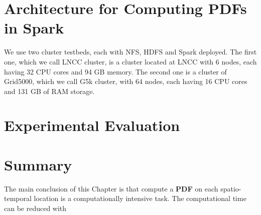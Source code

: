 \section{Architecture for Computing PDFs in Spark}\label{sec:spark_architecture}
We use two cluster testbeds, each with NFS, HDFS and Spark deployed. The first one, which we call LNCC cluster, is a cluster located at LNCC with 6 nodes, each having 32 CPU cores and 94 GB memory. The second one is a cluster of Grid5000, which we call G5k cluster, with 64 nodes, each having 16 CPU cores and 131 GB of RAM storage.

\section{Experimental Evaluation}\label{sec:experiments}

\section{Summary}\label{sec:summary}
The main conclusion of this Chapter is that compute a \textbf{PDF} on each spatio-temporal location is a computationally intensive task. The computational time can be reduced with 
